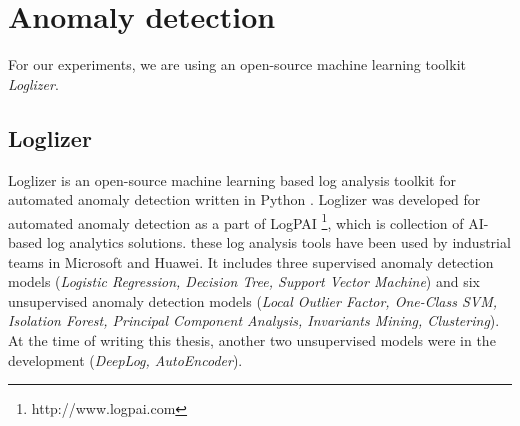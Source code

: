 \begin{figure}[!h] 
\end{figure}

\section{Anomaly detection}

For our experiments, we are using an open-source machine learning toolkit \textit{Loglizer}. 

\subsection{Loglizer}

Loglizer is an open-source machine learning based log analysis toolkit for automated anomaly detection written in Python \cite{he2016}. Loglizer was developed for automated anomaly detection as a part of LogPAI \footnote{http://www.logpai.com}, which is collection of AI-based log analytics solutions. these log analysis tools have been used by industrial teams in Microsoft and Huawei. It includes three supervised anomaly detection models (\textit{Logistic Regression, Decision Tree, Support Vector Machine}) and six unsupervised anomaly detection models (\textit{Local Outlier Factor, One-Class SVM, Isolation Forest, Principal Component Analysis, Invariants Mining, Clustering}). At the time of writing this thesis, another two unsupervised models were in the development (\textit{DeepLog, AutoEncoder}). \\

